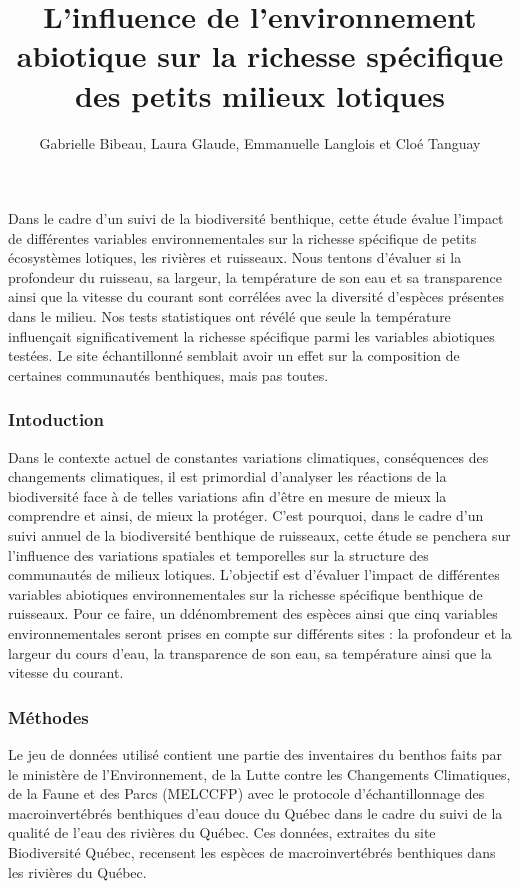 \documentclass[
]{article}
\title{L'influence de l'environnement abiotique sur la richesse
spécifique des petits milieux lotiques}
\author{Gabrielle Bibeau, Laura Glaude, Emmanuelle Langlois et Cloé
Tanguay}
\date{}
\begin{document}
\maketitle

Dans le cadre d'un suivi de la biodiversité benthique, cette étude
évalue l'impact de différentes variables environnementales sur la
richesse spécifique de petits écosystèmes lotiques, les rivières et
ruisseaux. Nous tentons d'évaluer si la profondeur du ruisseau, sa
largeur, la température de son eau et sa transparence ainsi que la
vitesse du courant sont corrélées avec la diversité d'espèces présentes
dans le milieu. Nos tests statistiques ont révélé que seule la
température influençait significativement la richesse spécifique parmi
les variables abiotiques testées. Le site échantillonné semblait avoir
un effet sur la composition de certaines communautés benthiques, mais
pas toutes.

\hypertarget{intoduction}{%
\subsubsection{Intoduction}\label{intoduction}}

Dans le contexte actuel de constantes variations climatiques,
conséquences des changements climatiques, il est primordial d'analyser
les réactions de la biodiversité face à de telles variations afin d'être
en mesure de mieux la comprendre et ainsi, de mieux la protéger. C'est
pourquoi, dans le cadre d'un suivi annuel de la biodiversité benthique
de ruisseaux, cette étude se penchera sur l'influence des variations
spatiales et temporelles sur la structure des communautés de milieux
lotiques. L'objectif est d'évaluer l'impact de différentes variables
abiotiques environnementales sur la richesse spécifique benthique de
ruisseaux. Pour ce faire, un ddénombrement des espèces ainsi que cinq
variables environnementales seront prises en compte sur différents sites
: la profondeur et la largeur du cours d'eau, la transparence de son
eau, sa température ainsi que la vitesse du courant.

\hypertarget{muxe9thodes}{%
\subsubsection{Méthodes}\label{muxe9thodes}}

Le jeu de données utilisé contient une partie des inventaires du benthos
faits par le ministère de l'Environnement, de la Lutte contre les
Changements Climatiques, de la Faune et des Parcs (MELCCFP) avec le
protocole d'échantillonnage des macroinvertébrés benthiques d'eau douce
du Québec dans le cadre du suivi de la qualité de l'eau des rivières du
Québec. Ces données, extraites du site Biodiversité Québec, recensent
les espèces de macroinvertébrés benthiques dans les rivières du Québec.
\end{document}
